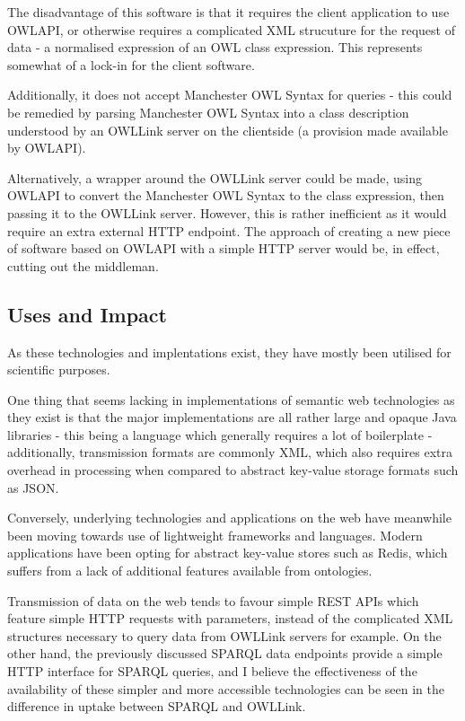 \documentclass{article}
\begin{document}
The disadvantage of this software is that it requires the client application
to use OWLAPI, or otherwise requires a complicated XML strucuture for the
request of data - a normalised expression of an OWL class expression. This
represents somewhat of a lock-in for the client software. 

Additionally, it does not accept Manchester OWL Syntax for queries - this could 
be remedied by parsing Manchester OWL Syntax into a class description understood 
by an OWLLink server on the clientside (a provision made available by OWLAPI).

Alternatively, a wrapper around the OWLLink server could be made, using OWLAPI
to convert the Manchester OWL Syntax to the class expression, then passing it to
the OWLLink server. However, this is rather inefficient as it would require an
extra external HTTP endpoint. The approach of creating a new piece of software 
based on OWLAPI with a simple HTTP server would be, in effect, cutting out the 
middleman.

\subsection{Uses and Impact}

As these technologies and implentations exist, they have mostly been utilised
for scientific purposes.

One thing that seems lacking in implementations of semantic web technologies as
they exist is that the major implementations are all rather large and opaque
Java libraries - this being a language which generally requires a lot of
boilerplate - additionally, transmission formats are commonly XML, which also
requires extra overhead in processing when compared to abstract key-value
storage formats such as JSON. 

Conversely, underlying technologies and applications on the web have meanwhile 
been moving towards use of lightweight frameworks and languages. Modern applications 
have been opting for abstract key-value stores such as Redis, which suffers from
a lack of additional features available from ontologies. 

Transmission of data on the web tends to favour simple REST APIs which feature 
simple HTTP requests with parameters, instead of the complicated XML structures 
necessary to query data from OWLLink servers for example. On the other hand, the
previously discussed SPARQL data endpoints provide a simple HTTP interface for
SPARQL queries, and I believe the effectiveness of the availability of these
simpler and more accessible technologies can be seen in the difference in uptake
between SPARQL and OWLLink.
\end{document}
